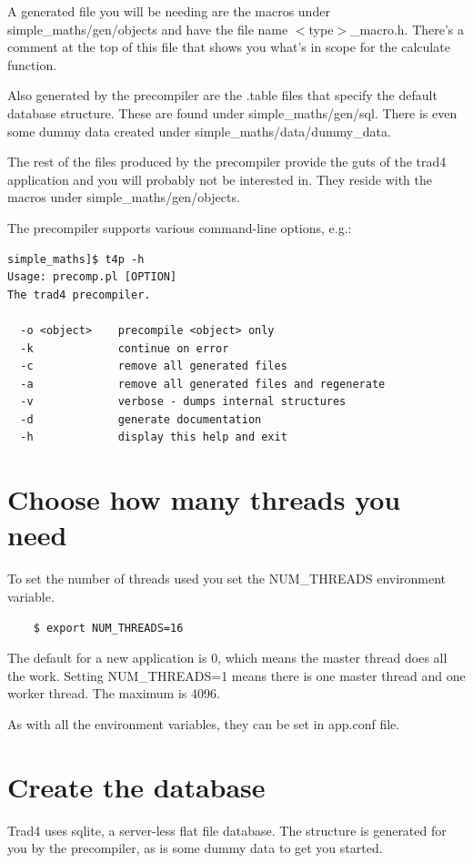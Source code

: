 \documentclass{report}
\begin{document}
A generated file you will be needing are the macros under simple_maths/gen/objects and have the file name $<$type$>$_macro.h. There's a comment at the top of this file that shows you what's in scope for the calculate function.

Also generated by the precompiler are the .table files that specify the default database structure. These are found under simple_maths/gen/sql. There is even some dummy data created under simple_maths/data/dummy_data.

The rest of the files produced by the precompiler provide the guts of the trad4 application and you will probably not be interested in. They reside with the macros under simple_maths/gen/objects.

The precompiler supports various command-line options, e.g.:

\begin{verbatim}
simple_maths]$ t4p -h
Usage: precomp.pl [OPTION]
The trad4 precompiler.

  -o <object>    precompile <object> only
  -k             continue on error
  -c             remove all generated files
  -a             remove all generated files and regenerate
  -v             verbose - dumps internal structures
  -d             generate documentation
  -h             display this help and exit
\end{verbatim}

\section{Choose how many threads you need}

To set the number of threads used you set the NUM_THREADS environment variable.

\begin{verbatim}
    $ export NUM_THREADS=16
\end{verbatim}

The default for a new application is 0, which means the master thread does all the work. Setting NUM_THREADS=1 means there is one master thread and one worker thread. The maximum is 4096.

As with all the environment variables, they can be set in app.conf file.


\section{Create the database}

Trad4 uses sqlite, a server-less flat file database. The structure is generated for you by the precompiler, as is some dummy data to get you started.
\end{document}
